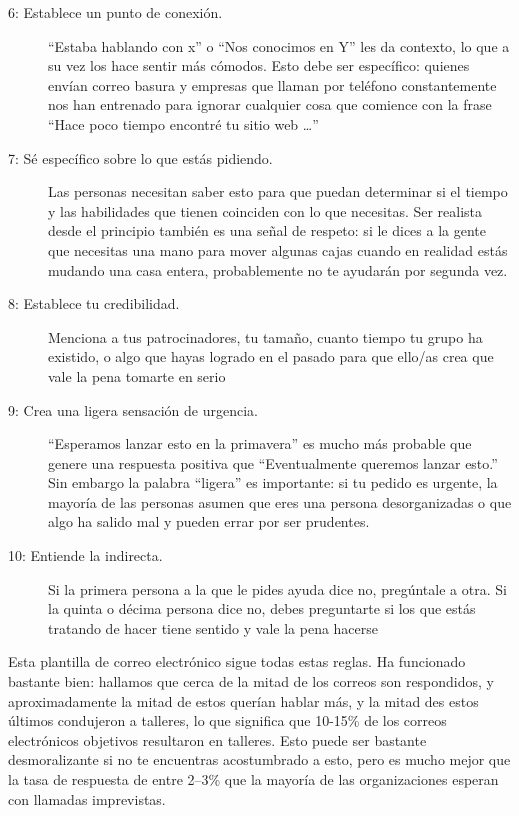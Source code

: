 \begin{description}
\item[6: Establece un punto de conexión.]
``Estaba hablando con x'' o ``Nos conocimos en Y'' les da contexto,
lo que a su vez los hace sentir más cómodos.
Esto debe ser específico:
quienes envían correo basura y empresas que llaman por teléfono constantemente
nos han entrenado para ignorar cualquier cosa que comience con la frase
``Hace poco tiempo encontré tu sitio web {\ldots}''
\item[7: Sé específico sobre lo que estás pidiendo.]

Las personas necesitan saber esto
para que puedan determinar si el tiempo y las habilidades que tienen
coinciden con lo que necesitas.
Ser realista desde el principio también es una señal de respeto:
 si le dices a la gente que necesitas una mano para  mover algunas cajas
 cuando en realidad estás mudando una casa entera,
 probablemente no te ayudarán por segunda vez.

\item[8: Establece tu credibilidad.]
Menciona a tus patrocinadores,
tu tamaño,
cuanto tiempo tu grupo ha existido, o algo que hayas logrado en el pasado
para que ello/as crea que vale la pena tomarte en serio


\item[9: Crea una ligera sensación de urgencia.]
``Esperamos lanzar esto en la primavera'' es mucho más probable que genere una respuesta positiva que ``Eventualmente queremos lanzar esto.''
Sin embargo la palabra ``ligera'' es importante:
si tu pedido es urgente, 
la mayoría de las personas asumen que eres una persona desorganizadas o que algo ha salido mal
y pueden errar por ser prudentes.


\item[10: Entiende la indirecta.]
Si la primera persona a la que le pides ayuda dice no,
pregúntale a otra.
Si la quinta o décima persona dice no,
debes preguntarte si los que estás tratando de hacer tiene sentido y vale la pena hacerse

\end{description}

Esta plantilla de correo electrónico sigue todas estas reglas.
Ha funcionado bastante bien:
hallamos que cerca de la mitad de los correos son respondidos,
y aproximadamente la mitad de estos querían hablar más,
y la mitad des estos últimos condujeron a talleres,
lo que significa que 10-15\% de los correos electrónicos objetivos resultaron en talleres.
Esto puede ser bastante desmoralizante si no te encuentras acostumbrado a esto, 
pero es mucho mejor que la tasa de respuesta de entre  2--3\% que la mayoría de las organizaciones esperan con llamadas imprevistas.

